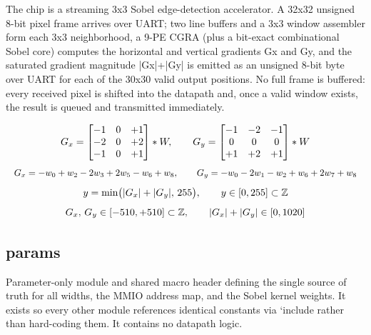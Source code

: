 \documentclass{ieeeaccess}
\begin{document}
The chip is a streaming 3x3 Sobel edge-detection accelerator. A 32x32 unsigned 8-bit pixel frame arrives over UART; two line buffers and a 3x3 window assembler form each 3x3 neighborhood, a 9-PE CGRA (plus a bit-exact combinational Sobel core) computes the horizontal and vertical gradients Gx and Gy, and the saturated gradient magnitude |Gx|+|Gy| is emitted as an unsigned 8-bit byte over UART for each of the 30x30 valid output positions. No full frame is buffered: every received pixel is shifted into the datapath and, once a valid window exists, the result is queued and transmitted immediately.

\begin{equation}
\resizebox{\ifdim\width>\columnwidth\columnwidth\else\width\fi}{!}{$\displaystyle
G_x = \begin{bmatrix}-1 & 0 & +1\\-2 & 0 & +2\\-1 & 0 & +1\end{bmatrix} * W,\qquad G_y = \begin{bmatrix}-1 & -2 & -1\\0 & 0 & 0\\+1 & +2 & +1\end{bmatrix} * W
$}
\end{equation}
\begin{equation}
\resizebox{\ifdim\width>\columnwidth\columnwidth\else\width\fi}{!}{$\displaystyle
G_x = -w_{0}+w_{2}-2w_{3}+2w_{5}-w_{6}+w_{8},\qquad G_y = -w_{0}-2w_{1}-w_{2}+w_{6}+2w_{7}+w_{8}
$}
\end{equation}
\begin{equation}
\resizebox{\ifdim\width>\columnwidth\columnwidth\else\width\fi}{!}{$\displaystyle
y = \min\bigl(|G_x|+|G_y|,\,255\bigr),\qquad y\in[0,255]\subset\mathbb{Z}
$}
\end{equation}
\begin{equation}
\resizebox{\ifdim\width>\columnwidth\columnwidth\else\width\fi}{!}{$\displaystyle
G_x,\,G_y\in[-510,+510]\subset\mathbb{Z},\qquad |G_x|+|G_y|\in[0,1020]
$}
\end{equation}
\subsection{params}
Parameter-only module and shared macro header defining the single source of truth for all widths, the MMIO address map, and the Sobel kernel weights. It exists so every other module references identical constants via `include rather than hard-coding them. It contains no datapath logic.
\end{document}

